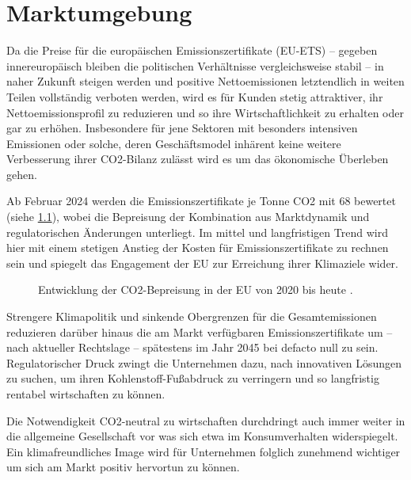 \chapter{Marktumgebung}

Da die Preise für die europäischen Emissionszertifikate (EU-ETS) -- gegeben innereuropäisch bleiben die politischen Verhältnisse vergleichsweise stabil -- in naher Zukunft steigen werden und positive Nettoemissionen letztendlich in weiten Teilen vollständig verboten werden, wird es für Kunden stetig attraktiver, ihr Nettoemissionsprofil zu reduzieren und so ihre Wirtschaftlichkeit zu erhalten oder gar zu erhöhen.
Insbesondere für jene Sektoren mit besonders intensiven Emissionen oder solche, deren Geschäftsmodel inhärent keine weitere Verbesserung ihrer CO2-Bilanz zulässt wird es um das ökonomische Überleben gehen.

Ab Februar 2024 werden die Emissionszertifikate je Tonne CO2 mit \qty{68}{\EUR} bewertet (siehe \cref{fig:carbon price tracker}), wobei die Bepreisung der Kombination aus Marktdynamik und regulatorischen Änderungen unterliegt.
Im mittel und langfristigen Trend wird hier mit einem stetigen Anstieg der Kosten für Emissionszertifikate zu rechnen sein und spiegelt das Engagement der EU zur Erreichung ihrer Klimaziele wider.

\begin{figure}[h]
    \centering
    
    \caption[Entwicklung der CO2-Bepreisung in der EU]{Entwicklung der CO2-Bepreisung in der EU von 2020 bis heute \cite{Statista2023.AvPriceEUETS}.}\label{fig:carbon price tracker}
\end{figure}

Strengere Klimapolitik und sinkende Obergrenzen für die Gesamtemissionen reduzieren darüber hinaus die am Markt verfügbaren Emissionszertifikate um -- nach aktueller Rechtslage -- spätestens im Jahr 2045 bei defacto null zu sein.
Regulatorischer Druck zwingt die Unternehmen dazu, nach innovativen Lösungen zu suchen, um ihren Kohlenstoff-Fußabdruck zu verringern und so langfristig rentabel wirtschaften zu können.

Die Notwendigkeit CO2-neutral zu wirtschaften durchdringt auch immer weiter in die allgemeine Gesellschaft vor was sich etwa im Konsumverhalten widerspiegelt.
Ein klimafreundliches Image wird für Unternehmen folglich zunehmend wichtiger um sich am Markt positiv hervortun zu können.\par\medskip

